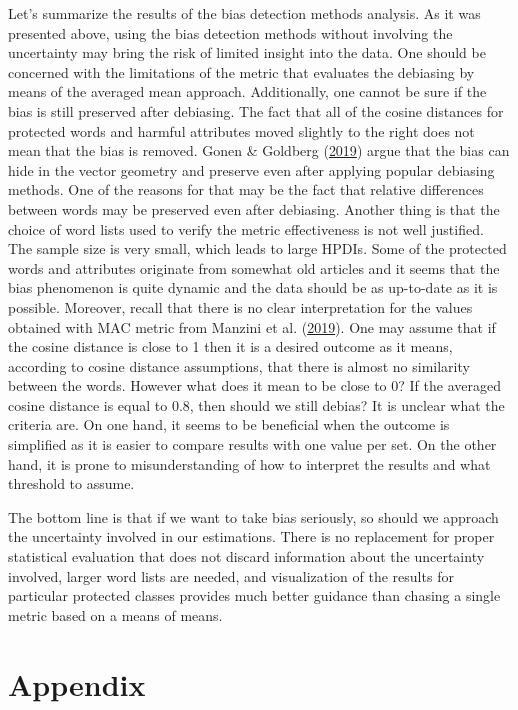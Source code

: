 \documentclass[12pt,]{book}
\begin{document}
Let's summarize the results of the bias detection methods analysis. As
it was presented above, using the bias detection methods without
involving the uncertainty may bring the risk of limited insight into the
data. One should be concerned with the limitations of the metric that
evaluates the debiasing by means of the averaged mean approach.
Additionally, one cannot be sure if the bias is still preserved after
debiasing. The fact that all of the cosine distances for protected words
and harmful attributes moved slightly to the right does not mean that
the bias is removed. Gonen \& Goldberg
(\protect\hyperlink{ref-Gonen2019Lipstick}{2019}) argue that the bias
can hide in the vector geometry and preserve even after applying popular
debiasing methods. One of the reasons for that may be the fact that
relative differences between words may be preserved even after
debiasing. Another thing is that the choice of word lists used to verify
the metric effectiveness is not well justified. The sample size is very
small, which leads to large HPDIs. Some of the protected words and
attributes originate from somewhat old articles and it seems that the
bias phenomenon is quite dynamic and the data should be as up-to-date as
it is possible. Moreover, recall that there is no clear interpretation
for the values obtained with MAC metric from Manzini et al.
(\protect\hyperlink{ref-Manzini2019blackToCriminal}{2019}). One may
assume that if the cosine distance is close to 1 then it is a desired
outcome as it means, according to cosine distance assumptions, that
there is almost no similarity between the words. However what does it
mean to be close to 0? If the averaged cosine distance is equal to 0.8,
then should we still debias? It is unclear what the criteria are. On one
hand, it seems to be beneficial when the outcome is simplified as it is
easier to compare results with one value per set. On the other hand, it
is prone to misunderstanding of how to interpret the results and what
threshold to assume.

The bottom line is that if we want to take bias seriously, so should we
approach the uncertainty involved in our estimations. There is no
replacement for proper statistical evaluation that does not discard
information about the uncertainty involved, larger word lists are
needed, and visualization of the results for particular protected
classes provides much better guidance than chasing a single metric based
on a means of means.

\chapter*{Appendix}\label{appendix}
\end{document}
